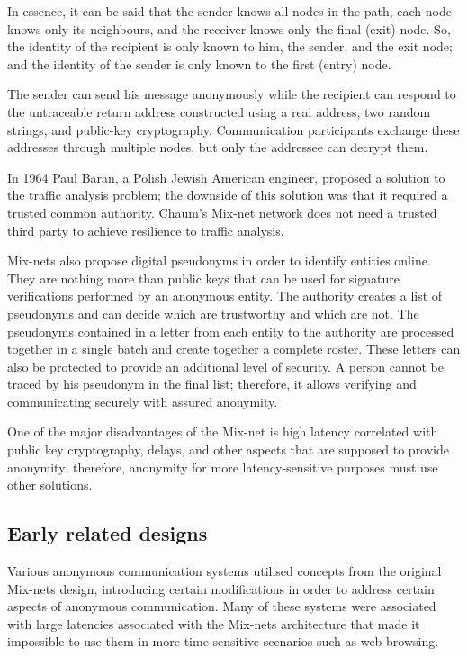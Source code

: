 In essence, it can be said that the sender knows all nodes in the path, each node knows only its neighbours, and the receiver knows only the final (exit) node. So, the identity of the recipient is only known to him, the sender, and the exit node; and the identity of the sender is only known to the first (entry) node.

The sender can send his message anonymously while the recipient can respond to the untraceable return address constructed using a real address, two random strings, and public-key cryptography. Communication participants exchange these addresses through multiple nodes, but only the addressee can decrypt them.

In 1964 \cite{Baran1964} Paul Baran, a Polish Jewish American engineer, proposed a solution to the traffic analysis problem; the downside of this solution was that it required a trusted common authority. Chaum's Mix-net network does not need a trusted third party to achieve resilience to traffic analysis. 

Mix-nets also propose digital pseudonyms in order to identify entities online. They are nothing more than public keys that can be used for signature verifications performed by an anonymous entity. The authority creates a list of pseudonyms and can decide which are trustworthy and which are not. The pseudonyms contained in a letter from each entity to the authority are processed together in a single batch and create together a complete roster. These letters can also be protected to provide an additional level of security. A person cannot be traced by his pseudonym in the final list; therefore, it allows verifying and communicating securely with assured anonymity. 

One of the major disadvantages of the Mix-net is high latency correlated with public key cryptography, delays, and other aspects that are supposed to provide anonymity; therefore, anonymity for more latency-sensitive purposes must use other solutions.

\subsection{Early related designs}
Various anonymous communication systems utilised concepts from the original Mix-nets design, introducing certain modifications in order to address certain aspects of anonymous communication.
Many of these systems were associated with large latencies associated with the Mix-nets architecture that made it impossible to use them in more time-sensitive scenarios such as web browsing.

